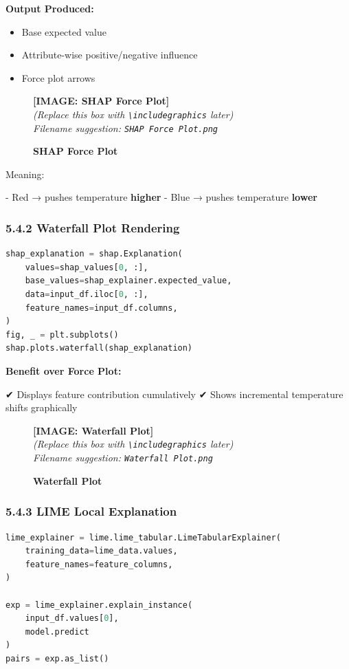 \documentclass[12pt, a4paper]{article}
\newcommand{\imageplaceholder}[2]{
  \begin{figure}[H]
    \centering
    \begin{tcolorbox}[colback=white, colframe=black, width=0.8\textwidth, arc=0mm, boxrule=1pt]
      \centering
      \vspace{#2}
      \textbf{\Large [IMAGE: #1]}\\
      \vspace{0.5cm}
      \textit{(Replace this box with \texttt{\textbackslash includegraphics} later)}\\
      \textit{Filename suggestion: \texttt{#1.png}}
      \vspace{#2}
    \end{tcolorbox}
    \caption{\textbf{#1}}
    \label{fig:#1}
  \end{figure}
}
\begin{document}
\textbf{Output Produced:}

\begin{itemize}
    \item Base expected value
    \item Attribute-wise positive/negative influence
    \item Force plot arrows
\end{itemize}

\imageplaceholder{SHAP Force Plot}{5cm}

Meaning:

- Red → pushes temperature \textbf{higher}  
- Blue → pushes temperature \textbf{lower}



\subsubsection{\textbf{5.4.2 Waterfall Plot Rendering}}

\begin{lstlisting}[language=Python]
shap_explanation = shap.Explanation(
    values=shap_values[0, :],
    base_values=shap_explainer.expected_value,
    data=input_df.iloc[0, :],
    feature_names=input_df.columns,
)
fig, _ = plt.subplots()
shap.plots.waterfall(shap_explanation)
\end{lstlisting}

\textbf{Benefit over Force Plot:}

✔ Displays feature contribution cumulatively  
✔ Shows incremental temperature shifts graphically  

\imageplaceholder{Waterfall Plot}{6cm}



\subsubsection{\textbf{5.4.3 LIME Local Explanation}}

\begin{lstlisting}[language=Python]
lime_explainer = lime.lime_tabular.LimeTabularExplainer(
    training_data=lime_data.values,
    feature_names=feature_columns,
)

exp = lime_explainer.explain_instance(
    input_df.values[0],
    model.predict
)
pairs = exp.as_list()
\end{lstlisting}
\end{document}
